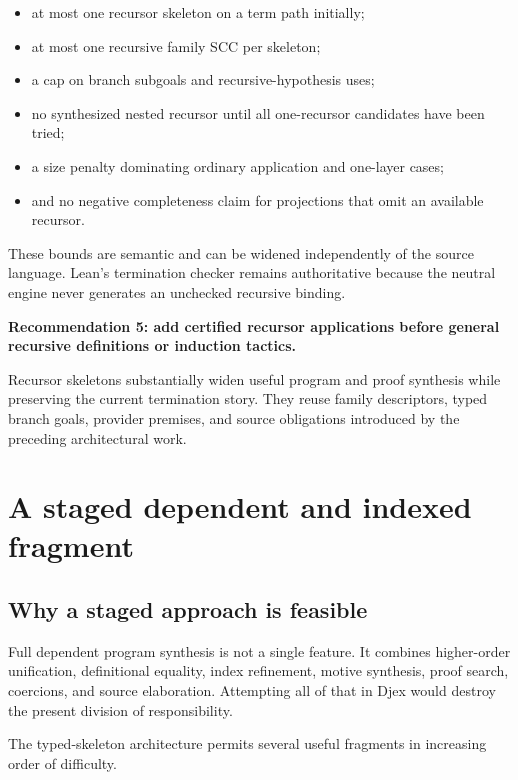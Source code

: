 \documentclass[11pt]{article}
\newcommand{\Djex}{\textsf{Djex}}
\newenvironment{recommendation}[1]
{\par\medskip\noindent\colorbox{GoodBg}{\parbox{\dimexpr\linewidth-2\fboxsep\relax}{\sffamily\bfseries #1}}\par\smallskip}
{\par\medskip}
\begin{document}
\begin{itemize}
  \item at most one recursor skeleton on a term path initially;
  \item at most one recursive family SCC per skeleton;
  \item a cap on branch subgoals and recursive-hypothesis uses;
  \item no synthesized nested recursor until all one-recursor candidates have
    been tried;
  \item a size penalty dominating ordinary application and one-layer cases;
  \item and no negative completeness claim for projections that omit an
    available recursor.
\end{itemize}

These bounds are semantic and can be widened independently of the source
language.  Lean's termination checker remains authoritative because the
neutral engine never generates an unchecked recursive binding.

\begin{recommendation}{Recommendation 5: add certified recursor applications before general recursive definitions or induction tactics.}
Recursor skeletons substantially widen useful program and proof synthesis while
preserving the current termination story.  They reuse family descriptors,
typed branch goals, provider premises, and source obligations introduced by the
preceding architectural work.
\end{recommendation}

\section{A staged dependent and indexed fragment}
\label{sec:dependent}

\subsection{Why a staged approach is feasible}

Full dependent program synthesis is not a single feature.  It combines
higher-order unification, definitional equality, index refinement, motive
synthesis, proof search, coercions, and source elaboration.  Attempting all of
that in \Djex{} would destroy the present division of responsibility.

The typed-skeleton architecture permits several useful fragments in increasing
order of difficulty.
\end{document}
